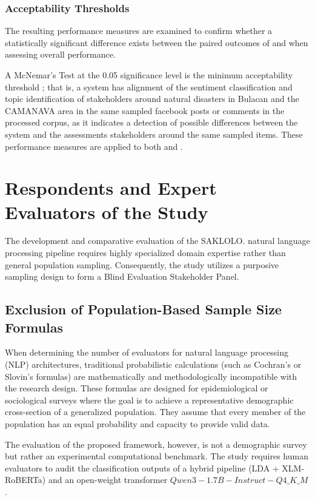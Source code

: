 \subsubsection*{Acceptability Thresholds}

The resulting performance measures are examined to confirm whether a
statistically significant difference exists between the paired outcomes of
\sysA{} and \sysB{} when assessing overall performance.

A McNemar's Test at the 0.05 significance level is the minimum acceptability threshold
\parencite{mcp2025}; that is, a system has alignment of the sentiment classification and topic identification of stakeholders around natural disasters in Bulacan and the CAMANAVA area in the same sampled facebook posts or comments in the processed corpus, as it
indicates a detection of possible differences between the system and the assessments
stakeholders around the same sampled items. These performance measures are applied to both \sysA{} and \sysB{}.

\section*{Respondents and Expert Evaluators of the Study}

The development and comparative evaluation of the SAKLOLO. natural language
processing pipeline requires highly specialized domain expertise rather than
general population sampling. Consequently, the study utilizes a purposive
sampling design to form a Blind Evaluation Stakeholder Panel.

\subsection*{Exclusion of Population-Based Sample Size Formulas}

When determining the number of evaluators for natural language processing (NLP)
architectures, traditional probabilistic calculations (such as Cochran's or
Slovin's formulas) are mathematically and methodologically incompatible with
the research design. These formulas are designed for epidemiological or
sociological surveys where the goal is to achieve a representative demographic
cross-section of a generalized population. They assume that every member of the
population has an equal probability and capacity to provide valid data.

The evaluation of the proposed framework, however, is not a demographic survey
but rather an experimental computational benchmark. The study requires human
evaluators to audit the classification outputs of a hybrid pipeline
(LDA + XLM-RoBERTa) and an open-weight transformer $Qwen3-1.7B-Instruct-Q4\_K\_M$.

